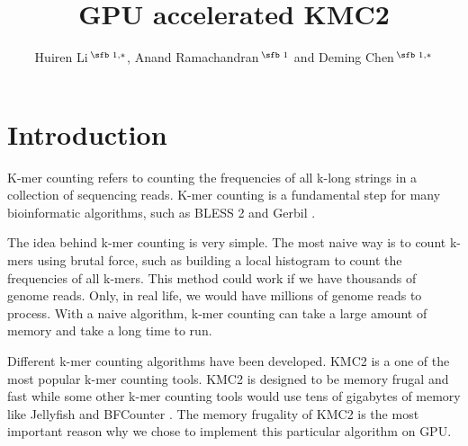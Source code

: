 \documentclass{bioinfo}
\begin{document}

\title[short Title]{GPU accelerated KMC2}
\author[]{Huiren Li\,$^{\text{\sfb 1,}*}$, Anand Ramachandran\,$^{\text{\sfb 1}}$ and
Deming Chen\,$^{\text{\sfb 1,}*}$}
\address{$^{\text{\sf 1}}$Department of Electrical and Computer Engineering, University of
Illinois at Urbana-Champaign, Urbana, IL 61801, USA}

\corresp{}




\maketitle

\section{Introduction}

K-mer counting refers to counting the frequencies of all  k-long strings in a collection
of sequencing reads.
K-mer counting is a fundamental step for many bioinformatic algorithms, such as BLESS 2
\citep{Heo16} and Gerbil \citep{Mar17}.

The idea behind k-mer counting is very simple. The most naive way is to count k-mers using
brutal force, such as building a local histogram to count the frequencies of all k-mers.
This method could work if we have thousands of genome reads. Only, in real life, we would
have millions of genome reads to process. With a naive algorithm, k-mer counting can take
a large amount of memory and take a long time to run.

Different k-mer counting algorithms have been developed.
KMC2 \citep{Seb14} is a one of the most popular k-mer counting tools. KMC2 is designed to
be memory frugal and fast while some other k-mer counting tools would use tens of
gigabytes of memory like Jellyfish \citep{Mar11} and BFCounter \citep{Mel11}.
The memory frugality of KMC2 is the most important reason why we chose to implement this
particular algorithm on GPU.
\end{document}

